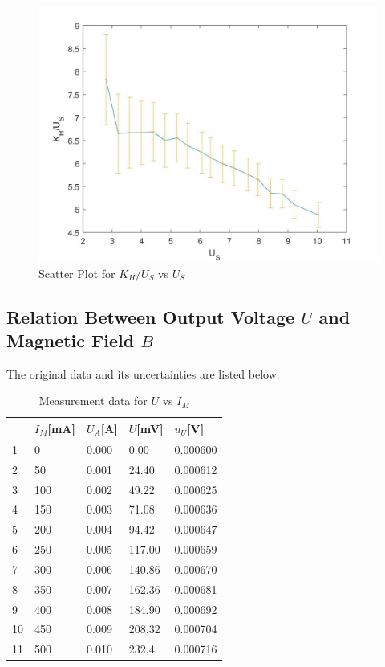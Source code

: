 \documentclass[12pt, a4paper]{article}
\begin{document}
\begin{figure}[H]
	\centering
	\includegraphics[scale = 0.3]{plot1.jpg}
	\caption{Scatter Plot for $K_H/U_S$ vs $U_S$}
\end{figure}

\subsection{Relation Between Output Voltage $U$ and Magnetic Field $B$}
The original data and its uncertainties are listed below:
\begin{table}[H]
	\begin{center}
		\begin{tabular}{|l|l|l|l|l|}
			\hline
			   & $I_M$[mA] & $U_A$[A] & $U$[mV]    & $u_U$[V]    \\ \hline
			1  & 0     & 0.000 & 0.00   & 0.000600 \\ \hline
			2  & 50    & 0.001 & 24.40  & 0.000612 \\ \hline
			3  & 100   & 0.002 & 49.22  & 0.000625 \\ \hline
			4  & 150   & 0.003 & 71.08  & 0.000636 \\ \hline
			5  & 200   & 0.004 & 94.42  & 0.000647 \\ \hline
			6  & 250   & 0.005 & 117.00 & 0.000659 \\ \hline
			7  & 300   & 0.006 & 140.86 & 0.000670 \\ \hline
			8  & 350   & 0.007 & 162.36 & 0.000681 \\ \hline
			9  & 400   & 0.008 & 184.90 & 0.000692 \\ \hline
			10 & 450   & 0.009 & 208.32 & 0.000704 \\ \hline
			11 & 500   & 0.010 & 232.4  & 0.000716 \\ \hline
			\end{tabular}
			\caption{Measurement data for $U$ vs $I_M$}
	\end{center}
\end{table}
\end{document}
